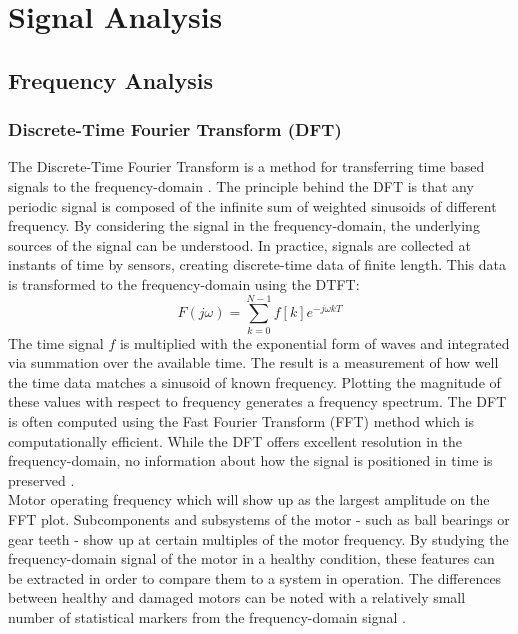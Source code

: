 \documentclass[conference]{IEEEtran}
\begin{document}
\section{Signal Analysis}

\subsection{Frequency Analysis}

\subsubsection{Discrete-Time Fourier Transform (DFT)}
The Discrete-Time Fourier Transform is a method for transferring time based signals to the frequency-domain \cite{Vibration Book}. The principle behind the DFT is that any periodic signal is composed of the infinite sum of weighted sinusoids of different frequency. By considering the signal in the frequency-domain, the underlying sources of the signal can be understood. In practice, signals are collected at instants of time by sensors, creating discrete-time data of finite length. This data is transformed to the frequency-domain using the DTFT: \cite{Vibration Book}
\begin{equation*} %
F(j\omega) = \sum^{N-1}_{k=0} f[k]e^{-j\omega kT}
\end{equation*}
The time signal $f$ is multiplied with the exponential form of waves and integrated via summation over the available time. The result is a measurement of how well the time data matches a sinusoid of known frequency. Plotting the magnitude of these values with respect to frequency generates a frequency spectrum. The DFT is often computed using the Fast Fourier Transform (FFT) method which is computationally efficient. While the DFT offers excellent resolution in the frequency-domain, no information about how the signal is positioned in time is preserved \cite{Wavelets}.\\
Motor operating frequency which will show up as the largest amplitude on the FFT plot. Subcomponents and subsystems of the motor - such as ball bearings or gear teeth - show up at certain multiples of the motor frequency\cite{Vibration Book}. By studying the frequency-domain signal of the motor in a healthy condition, these features can be extracted in order to compare them to a system in operation. The differences between healthy and damaged motors can be noted with a relatively small number of statistical markers from the frequency-domain signal \cite{Wavelet Study}.
\end{document}
